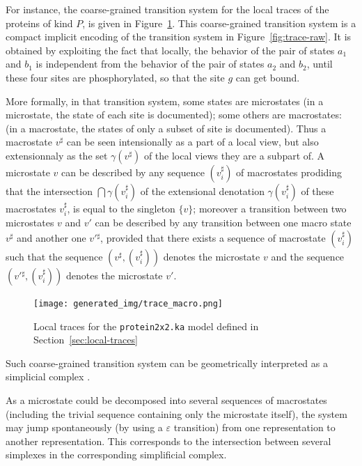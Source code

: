 \documentclass[11pt]{book}
\def\ttt#1{\texttt{#1}}
\begin{document}
For instance, the coarse-grained transition system for the local traces of the proteins of kind $P$, is given in Figure~\ref{fig:trace-macro}.  This  coarse-grained transition system is a compact implicit encoding of the transition system in Figure~\ref{fig:trace-raw}. It is obtained by exploiting the fact that locally, the behavior of the pair of states $a_1$ and $b_1$ is independent from the behavior of the pair of states $a_2$ and $b_2$, until these four sites are phosphorylated, so that the site $g$ can get bound.


More formally, in that transition system, some states are microstates (in a microstate, the state of each site is documented); some others are macrostates: (in a macrostate, the states of only a subset of site is documented).
Thus a macrostate $v^{\sharp}$ can be seen intensionally as a part  of a local view, but also extensionnaly as the set $\gamma(v^{\sharp})$ of the local views they are a subpart of. A microstate $v$ can be described by any sequence $(v_i^{\sharp})$ of macrostates prodiding that the intersection $\bigcap \gamma(v^{\sharp}_i)$ of the extensional denotation $\gamma(v^{\sharp}_i)$ of these macrostates $v^{\sharp}_i$, is equal to the singleton $\{v\}$;
moreover a transition between two microstates $v$ and $v'$ can be described by any transition between one macro state $v^{\sharp}$ and another one $v'{}^{\sharp}$, provided that there exists a sequence of macrostate $(v^{\sharp}_i)$ such that the sequence $(v^{\sharp},(v^{\sharp}_i))$ denotes the microstate $v$ and the sequence $(v'{}^{\sharp},(v^{\sharp}_i))$ denotes the microstate $v'$.

\begin{figure}[htbp]
\centering
\texttt{[image: generated\_img/trace\_macro.png]}
\caption{Local traces for the \ttt{protein2x2.ka} model defined in Section~\ref{sec:local-traces}}
\label{fig:trace-macro}
\end{figure}

Such coarse-grained transition system can be geometrically interpreted as a simplicial complex \cite{DBLP:conf/concur/FajstrupGR98}.

As a microstate could be decomposed into several sequences of macrostates (including the trivial sequence containing only the microstate itself), the system may jump spontaneously (by using a $\varepsilon$ transition) from one representation to another representation. This corresponds to the intersection between several simplexes in the corresponding simplificial complex.
\end{document}
